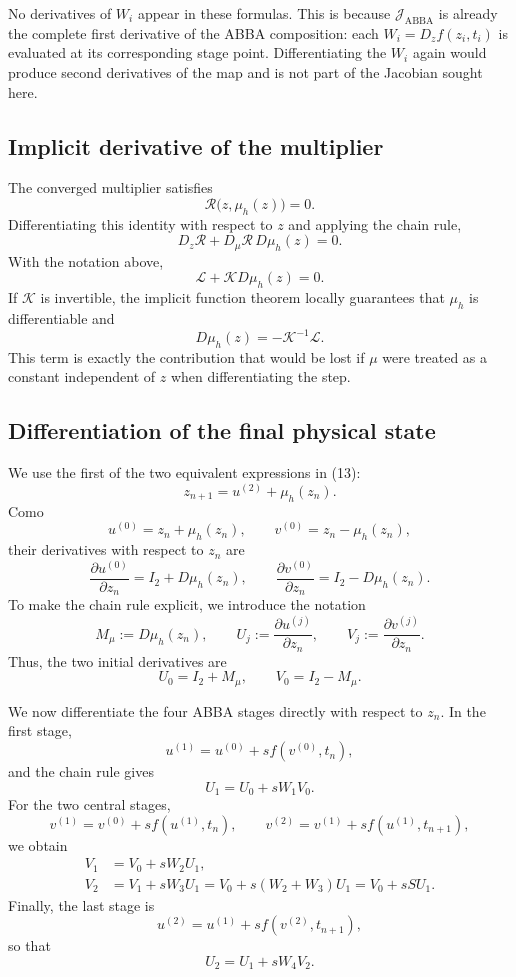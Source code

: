 \documentclass[11pt,a4paper]{article}
\newcommand{\Id}{I}
\begin{document}
No derivatives of $W_i$ appear in these formulas. This is because
$\mathcal J_{\mathrm{ABBA}}$ is already the complete first derivative of the ABBA
composition: each $W_i=D_zf(z_i,t_i)$ is evaluated at its corresponding stage point.
Differentiating the $W_i$ again would produce second derivatives of the map and is not
part of the Jacobian sought here.

\subsection{Implicit derivative of the multiplier}

The converged multiplier satisfies
\[
 \mathcal R\bigl(z,\mu_h(z)\bigr)=0.
\]
Differentiating this identity with respect to $z$ and applying the chain rule,
\[
 D_z\mathcal R
 +D_\mu\mathcal R\,D\mu_h(z)=0.
\]
With the notation above,
\[
 \mathcal L+\mathcal K D\mu_h(z)=0.
\]
If $\mathcal K$ is invertible, the implicit function theorem locally guarantees that
$\mu_h$ is differentiable and
\[
 \boxed{
 D\mu_h(z)=-\mathcal K^{-1}\mathcal L.
 }
\]
This term is exactly the contribution that would be lost if $\mu$ were treated as a
constant independent of $z$ when differentiating the step.

\subsection{Differentiation of the final physical state}

We use the first of the two equivalent expressions in (13):
\[
 z_{n+1}=u^{(2)}+\mu_h(z_n).
\]
Como
\[
 u^{(0)}=z_n+\mu_h(z_n),
 \qquad
 v^{(0)}=z_n-\mu_h(z_n),
\]
their derivatives with respect to $z_n$ are
\[
 \frac{\partial u^{(0)}}{\partial z_n}
 =\Id_2+D\mu_h(z_n),
 \qquad
 \frac{\partial v^{(0)}}{\partial z_n}
 =\Id_2-D\mu_h(z_n).
\]
To make the chain rule explicit, we introduce the notation
\[
 M_\mu:=D\mu_h(z_n),
 \qquad
 U_j:=\frac{\partial u^{(j)}}{\partial z_n},
 \qquad
 V_j:=\frac{\partial v^{(j)}}{\partial z_n}.
\]
Thus, the two initial derivatives are
\[
 U_0=\Id_2+M_\mu,
 \qquad
 V_0=\Id_2-M_\mu.
\]

We now differentiate the four ABBA stages directly with respect to $z_n$. In the first stage,
\[
 u^{(1)}=u^{(0)}+s f(v^{(0)},t_n),
\]
and the chain rule gives
\[
 U_1=U_0+sW_1V_0.
\]
For the two central stages,
\[
 v^{(1)}=v^{(0)}+s f(u^{(1)},t_n),
 \qquad
 v^{(2)}=v^{(1)}+s f(u^{(1)},t_{n+1}),
\]
we obtain
\begin{align*}
 V_1&=V_0+sW_2U_1,\\
 V_2&=V_1+sW_3U_1
     =V_0+s(W_2+W_3)U_1
     =V_0+sS U_1.
\end{align*}
Finally, the last stage is
\[
 u^{(2)}=u^{(1)}+s f(v^{(2)},t_{n+1}),
\]
so that
\[
 U_2=U_1+sW_4V_2.
\]
\end{document}
